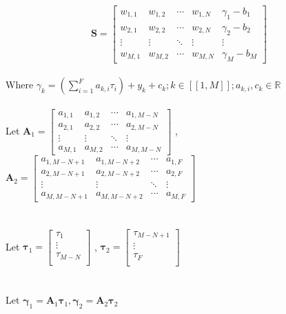 \documentclass{article}
\begin{document}
\begin{equation}
    \textbf{S}= \left[\begin{array}{cccc|c}  
    w_{1,1} & w_{1,2} & \cdots & w_{1,N} & \gamma_{1}-b_{1} \\
    w_{2,1} & w_{2,2} & \cdots & w_{2,N} & \gamma_{2}-b_{2}\\
    \vdots  & \vdots  & \ddots & \vdots & \vdots\\
    w_{M,1} & w_{M,2} & \cdots & w_{M,N} & \gamma_{M}-b_{M}
   \end{array}\right]
\end{equation}
\\
Where $\gamma_{k} = (\sum_{i=1}^{F} a_{k,i}\tau_{i}) + y_{k} +c_{k} ;  k \in [\![1,M]\!] ; a_{k,i},c_{k}\in \mathbb{R} $ 
\\\\
Let $\textbf{A}_{1} = \begin{bmatrix}
    a_{1,1} & a_{1,2} & \cdots & a_{1,M-N} \\
    a_{2,1} & a_{2,2} & \cdots & a_{2,M-N} \\
    \vdots  & \vdots  & \ddots & \vdots  \\
    a_{M,1} & a_{M,2} & \cdots & a_{M,M-N} 
    \end{bmatrix}$
, $\textbf{A}_{2} = \begin{bmatrix}
    a_{1,M-N+1} & a_{1,M-N+2} & \cdots & a_{1,F} \\
    a_{2,M-N+1} & a_{2,M-N+2} & \cdots & a_{2,F} \\
    \vdots  & \vdots  & \ddots & \vdots  \\
    a_{M,M-N+1} & a_{M,M-N+2} & \cdots & a_{M,F} 
    \end{bmatrix}$
\\\\\\
Let $\boldsymbol{\tau}_{1}=\begin{bmatrix}
    \tau_{1} \\
    \vdots \\
    \tau_{M-N} \\
\end{bmatrix}
$
, $\boldsymbol{\tau}_{2}=\begin{bmatrix}
    \tau_{M-N+1} \\
    \vdots \\
    \tau_{F} \\
\end{bmatrix}
$
\
\\\\\\
Let $\boldsymbol{\gamma}_{1} = \textbf{A}_{1}\boldsymbol{\tau}_{1},\boldsymbol{\gamma}_{2} = \textbf{A}_{2}\boldsymbol{\tau}_{2}$
\end{document}
